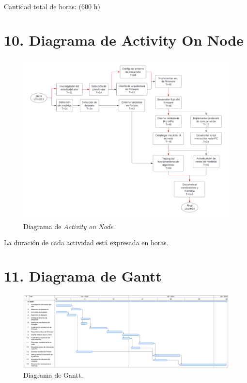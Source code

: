 \documentclass[
11pt, %
codirector, %
]{charter}
\begin{document}
Cantidad total de horas: (600 h)

\section{10. Diagrama de Activity On Node}
\label{sec:AoN}

\begin{figure}[htpb]
\centering 
\includegraphics[width=1\textwidth]{./Figuras/AoN.pdf}
\caption{Diagrama de \textit{Activity on Node}.}
\label{fig:AoN}
\end{figure}

La duración de cada actividad está expresada en horas.

\section{11. Diagrama de Gantt}
\label{sec:gantt}

\begin{landscape}
\begin{figure}[htpb]
\centering 
\includegraphics[width=1.50\textwidth]{./Figuras/Gantt.pdf}
\caption{Diagrama de Gantt.}
\label{fig:AoN}
\end{figure}

\end{landscape}
\end{document}
